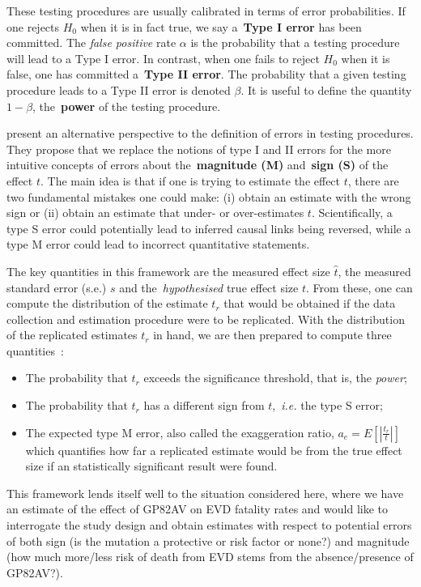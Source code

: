 These testing procedures are usually calibrated in terms of error probabilities.
If one rejects $H_0$ when it is in fact true, we say a~\textbf{Type I error}  has been committed.
The \textit{false positive} rate $\alpha$ is the probability that a testing procedure will lead to a Type I error.
In contrast, when one fails to reject $H_0$ when it is false, one has committed a~\textbf{Type II error}.
The probability that a given testing procedure leads to a Type II error is denoted $\beta$.
It is useful to define the quantity $1-\beta$, the~\textbf{power} of the testing procedure.

\cite{Gelman2014} present an alternative perspective to the definition of errors in testing procedures.
They propose that we replace the notions of type I and II errors for the more intuitive concepts of errors about the~\textbf{magnitude (M)} and~\textbf{sign (S)} of the effect $t$.
The main idea is that if one is trying to estimate the effect $t$, there are two fundamental mistakes one could make: (i) obtain an estimate with the wrong sign or (ii) obtain an estimate that under- or over-estimates $t$.
Scientifically, a type S error could potentially lead to inferred causal links being reversed, while a type M error could lead to incorrect quantitative statements.

The key quantities in this framework are the measured effect size $\hat{t}$, the measured standard error (s.e.) $s$ and the~\textit{hypothesised} true effect size $t$.
From these, one can compute the distribution of the estimate $t_r$  that would be  obtained if the data collection and estimation procedure were to be replicated. 
With the distribution of the replicated estimates $t_r$ in hand, we are then prepared to compute three quantities~\citep{Gelman2014}:
\begin{itemize}
 \item The probability that $t_r$ exceeds the significance threshold, that is, the \textit{power};
 \item The probability that $t_r$ has a different sign from $t$,~\textit{i.e.} the type S error;
 \item The expected type M error, also called the exaggeration ratio, $a_e = E[|\frac{t_r}{t}|]$ which quantifies how far a replicated estimate would be from the true effect size if an statistically significant result were found. 
\end{itemize}

This framework lends itself well to the situation considered here, where we have an estimate of the effect of GP82AV on EVD fatality rates and would like to interrogate the study design and obtain estimates with respect to potential errors of both sign (is the mutation a protective or risk factor or none?) and magnitude (how much more/less risk of death from EVD stems from the absence/presence of GP82AV?).

